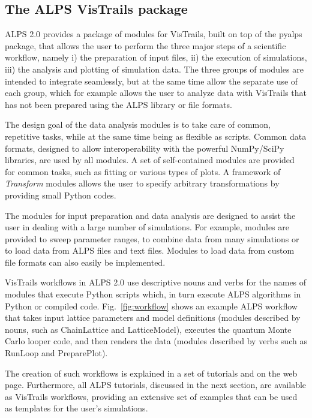 \documentclass[12pt]{iopart}
\begin{document}
\subsection{The ALPS VisTrails package}

ALPS 2.0 provides a package of modules for VisTrails, built on top of the pyalps package, that allows the user to perform the three major steps of a scientific workflow, namely i) the preparation of input files, ii) the execution of simulations, iii) the analysis and plotting of simulation data. The three groups of modules are intended to integrate seamlessly, but at the same time allow the separate use of each group, which for example allows the user to analyze data with VisTrails that has not been prepared using the ALPS library or file formats.

The design goal of the data analysis modules is to take care of common, repetitive tasks, while at the same time being as flexible as scripts. Common data formats, designed to allow interoperability with the powerful NumPy/SciPy libraries, are used by all modules. A set of self-contained modules are provided for common tasks, such as fitting or various types of plots. A framework of {\it Transform} modules allows the user to specify arbitrary transformations by providing small Python codes.

The modules for input preparation and data analysis are designed to assist the user in dealing with a large number of simulations. For example, modules are provided to sweep parameter ranges, to combine data from many simulations or to load data from ALPS files and text files. Modules to load data from custom file formats can also easily be implemented.

VisTrails workflows in ALPS 2.0 use descriptive nouns and verbs for the names of modules that execute
 Python scripts which, in turn execute ALPS
algorithms in Python or compiled code. Fig.~\ref{fig:workflow} shows an example ALPS workflow
that takes input lattice parameters and model definitions (modules described by nouns, such as 
 ChainLattice and LatticeModel), executes the quantum
Monte Carlo looper code, and then renders the data (modules described by verbs such as RunLoop and PreparePlot).

The creation of such workflows is explained in a set of tutorials and on the web page. Furthermore, all ALPS tutorials, discussed in the next section, are available as VisTrails workflows, providing an extensive set of examples that can be used as templates for the user's simulations. 
\end{document}
